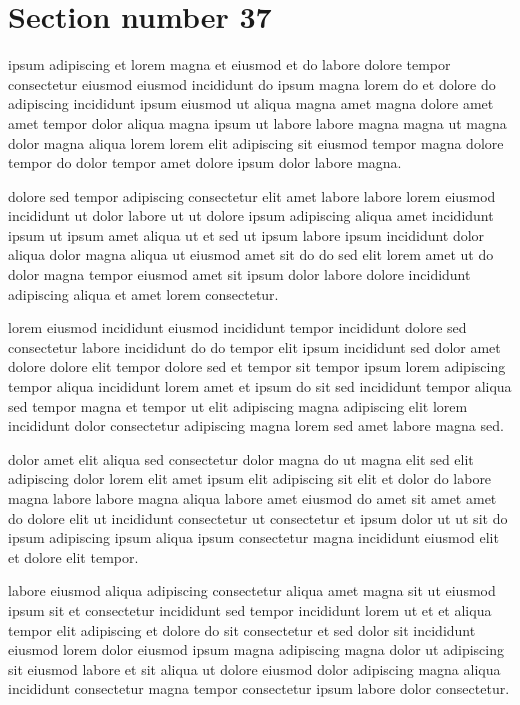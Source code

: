 \documentclass{article}
\begin{document}
\section{Section number 37}\label{sec:37}
ipsum adipiscing et lorem magna et eiusmod et do labore dolore tempor consectetur eiusmod eiusmod incididunt do ipsum magna lorem do et dolore do adipiscing incididunt ipsum eiusmod ut aliqua magna amet magna dolore amet amet tempor dolor aliqua magna ipsum ut labore labore magna magna ut magna dolor magna aliqua lorem lorem elit adipiscing sit eiusmod tempor magna dolore tempor do dolor tempor amet dolore ipsum dolor labore magna.

dolore sed tempor adipiscing consectetur elit amet labore labore lorem eiusmod incididunt ut dolor labore ut ut dolore ipsum adipiscing aliqua amet incididunt ipsum ut ipsum amet aliqua ut et sed ut ipsum labore ipsum incididunt dolor aliqua dolor magna aliqua ut eiusmod amet sit do do sed elit lorem amet ut do dolor magna tempor eiusmod amet sit ipsum dolor labore dolore incididunt adipiscing aliqua et amet lorem consectetur.

lorem eiusmod incididunt eiusmod incididunt tempor incididunt dolore sed consectetur labore incididunt do do tempor elit ipsum incididunt sed dolor amet dolore dolore elit tempor dolore sed et tempor sit tempor ipsum lorem adipiscing tempor aliqua incididunt lorem amet et ipsum do sit sed incididunt tempor aliqua sed tempor magna et tempor ut elit adipiscing magna adipiscing elit lorem incididunt dolor consectetur adipiscing magna lorem sed amet labore magna sed.

dolor amet elit aliqua sed consectetur dolor magna do ut magna elit sed elit adipiscing dolor lorem elit amet ipsum elit adipiscing sit elit et dolor do labore magna labore labore magna aliqua labore amet eiusmod do amet sit amet amet do dolore elit ut incididunt consectetur ut consectetur et ipsum dolor ut ut sit do ipsum adipiscing ipsum aliqua ipsum consectetur magna incididunt eiusmod elit et dolore elit tempor.

labore eiusmod aliqua adipiscing consectetur aliqua amet magna sit ut eiusmod ipsum sit et consectetur incididunt sed tempor incididunt lorem ut et et aliqua tempor elit adipiscing et dolore do sit consectetur et sed dolor sit incididunt eiusmod lorem dolor eiusmod ipsum magna adipiscing magna dolor ut adipiscing sit eiusmod labore et sit aliqua ut dolore eiusmod dolor adipiscing magna aliqua incididunt consectetur magna tempor consectetur ipsum labore dolor consectetur.
\end{document}
